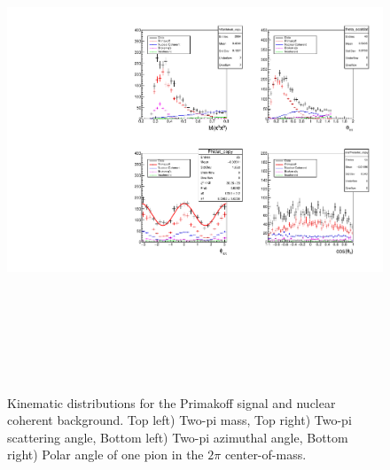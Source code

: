  \begin{figure}[tbp]
\begin{center}
\includegraphics[height=15cm,clip=true]{figures/twopi_primakoff_DSelect_test_File_100000_decomposition_PrimNCICeta.pdf}
\caption{Kinematic distributions for the Primakoff signal and nuclear coherent background.
Top left) Two-pi mass, Top right) Two-pi scattering angle, Bottom left) Two-pi azimuthal angle, 
Bottom right) Polar angle of one pion in the $2\pi$ center-of-mass.
\label{fig:decomposition_PrimNC}}
\end{center} 
\end{figure}




